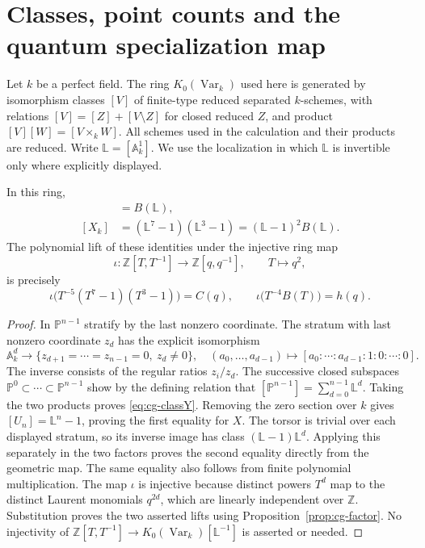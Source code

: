 \section{Classes, point counts and the quantum specialization map}
\label{sec:cg-counts}
Let $k$ be a perfect field. The ring $K_0(\operatorname{Var}_k)$ used here is
generated by isomorphism classes $[V]$ of finite-type reduced separated
$k$-schemes, with relations $[V]=[Z]+[V\setminus Z]$ for closed reduced
$Z$, and product $[V][W]=[V\times_k W]$. All schemes used in the
calculation and their products are reduced. Write
$\mathbb L=[\mathbb A^1_k]$. We use the localization in which
$\mathbb L$ is invertible only where explicitly displayed.

\begin{proposition}\label{prop:cg-classes}
In this ring,
\begin{align}
 [Y_k]&=B(\mathbb L),\label{eq:cg-classY}\\
 [X_k]&=(\mathbb L^7-1)(\mathbb L^3-1)
       =(\mathbb L-1)^2B(\mathbb L).\label{eq:cg-classX}
\end{align}
The polynomial lift of these identities under the injective ring map
\[
 \iota:\mathbb Z[T,T^{-1}]\longrightarrow\mathbb Z[q,q^{-1}],
 \qquad T\longmapsto q^2,
\]
is precisely
\[
 \iota\bigl(T^{-5}(T^7-1)(T^3-1)\bigr)=C(q),\qquad
 \iota\bigl(T^{-4}B(T)\bigr)=h(q).
\]
\end{proposition}
\begin{proof}
In $\mathbb P^{n-1}$ stratify by the last nonzero coordinate. The stratum
with last nonzero coordinate $z_d$ has the explicit isomorphism
\[
 \mathbb A^d_k\longrightarrow
 \{z_{d+1}=\cdots=z_{n-1}=0,\ z_d\ne0\},\quad
 (a_0,\ldots,a_{d-1})\longmapsto[a_0:\cdots:a_{d-1}:1:0:\cdots:0].
\]
The inverse consists of the regular ratios $z_i/z_d$. The successive
closed subspaces $\mathbb P^0\subset\cdots\subset\mathbb P^{n-1}$
show by the defining relation that
$[\mathbb P^{n-1}]=\sum_{d=0}^{n-1}\mathbb L^d$. Taking the two
products proves \eqref{eq:cg-classY}. Removing the zero section over
$k$ gives $[U_n]=\mathbb L^n-1$, proving the first equality for $X$.
The torsor is trivial over each displayed stratum, so its inverse image
has class $(\mathbb L-1)\mathbb L^d$. Applying this separately in
the two factors proves the second equality directly from the geometric
map. The same equality also follows from finite polynomial multiplication.
The map $\iota$ is injective because distinct powers $T^d$ map to the
distinct Laurent monomials $q^{2d}$, which are linearly independent over
$\mathbb Z$. Substitution proves the two asserted lifts using
Proposition~\ref{prop:cg-factor}. No injectivity of
$\mathbb Z[T,T^{-1}]\to K_0(\operatorname{Var}_k)[\mathbb L^{-1}]$
is asserted or needed.
\end{proof}

